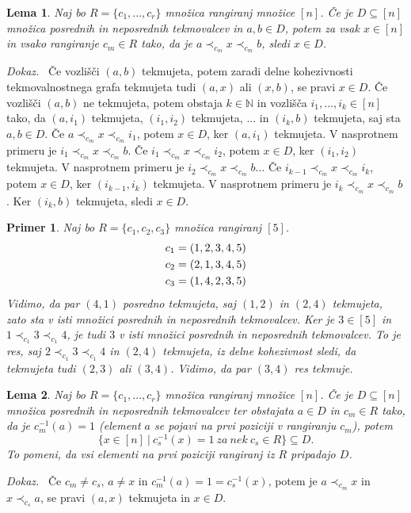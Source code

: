 \documentclass[a4paper, 12pt]{book}
\newtheorem{lema}{Lema}[chapter]
\newtheorem{primer}{Primer}[chapter]
\newenvironment{dokaz}{\emph{Dokaz.}\ }{\hspace{\fill}{$\Box$}}
\begin{document}
\begin{lema}
\label{lema_algoritem_posredni_tekmovalci_1}
    Naj bo $R = \{ c_1, ..., c_r \}$ množica rangiranj množice $[n]$. Če je $D \subseteq [n]$ množica posrednih in neposrednih tekmovalcev in $a, b \in D$, potem za vsak $x \in [n]$ in vsako rangiranje $c_m \in R$ tako, da je $a \prec_{c_m} x \prec_{c_m} b$, sledi $x \in D$.
\end{lema}
\begin{dokaz}
    Če vozlišči $(a, b)$ tekmujeta, potem zaradi delne kohezivnosti tekmovalnostnega grafa tekmujeta tudi $(a, x)$ ali $(x, b)$, se pravi $x \in D$. Če vozlišči $(a, b)$ ne tekmujeta, potem obstaja $k \in \mathbb{N}$ in vozlišča $i_1, ..., i_k \in [n]$ tako, da $(a, i_1)$ tekmujeta, $(i_1, i_2)$ tekmujeta, ... in $(i_k, b)$ tekmujeta, saj sta $a,b \in D$. Če $a \prec_{c_m} x \prec_{c_m} i_1$, potem $x \in D$, ker $(a, i_1)$ tekmujeta. V nasprotnem primeru je $i_1 \prec_{c_m} x \prec_{c_m} b$. Če $i_1 \prec_{c_m} x \prec_{c_m} i_2$, potem $x \in D$, ker $(i_1, i_2)$ tekmujeta. V nasprotnem primeru je $i_2 \prec_{c_m} x \prec_{c_m} b$... Če $i_{k-1} \prec_{c_m} x \prec_{c_m} i_k$, potem $x \in D$, ker $(i_{k-1}, i_k)$ tekmujeta. V nasprotnem primeru je $i_k \prec_{c_m} x \prec_{c_m} b$. Ker $(i_k, b)$ tekmujeta, sledi $x \in D$.
\end{dokaz}

\begin{primer}
    Naj bo $R = \{ c_1, c_2, c_3\}$ množica rangiranj $[5]$.
    \begin{align}
        c_1 &= (1, 2, 3, 4, 5) \notag\\
        c_2 &= (2, 1, 3, 4, 5) \notag\\
        c_3 &= (1, 4, 2, 3, 5) \notag
    \end{align}
    Vidimo, da par $(4, 1)$ posredno tekmujeta, saj $(1, 2)$ in $(2, 4)$ tekmujeta, zato sta v isti množici posrednih in neposrednih tekmovalcev. Ker je $3 \in [5]$ in $1 \prec_{c_1} 3 \prec_{c_1} 4$, je tudi $3$ v isti množici posrednih in neposrednih tekmovalcev. To je res, saj $2 \prec_{c_1} 3 \prec_{c_1} 4$ in $(2, 4)$ tekmujeta, iz delne kohezivnost sledi, da tekmujeta tudi $(2, 3)$ ali $(3, 4)$. Vidimo, da par $(3, 4)$ res tekmuje.
\end{primer}

\begin{lema}
\label{lema_algoritem_posredni_tekmovalci_2}
    Naj bo $R = \{ c_1, ..., c_r \}$ množica rangiranj množice $[n]$. Če je $D \subseteq [n]$ množica posrednih in neposrednih tekmovalcev ter obstajata $a \in D$ in  $c_m \in R$ tako, da je $c_m^{-1}(a) = 1$ (element $a$ se pojavi na prvi poziciji v rangiranju $c_m$), potem 
    \[
        \{ x \in [n] \ | \ c_s^{-1}(x) = 1 \ za \ nek \ c_s \in R \} \subseteq D.    
    \]
    To pomeni, da vsi elementi na prvi poziciji rangiranj iz $R$ pripadajo $D$.
\end{lema}
\begin{dokaz}
    Če $c_m \neq c_s$,  $a \neq x$ in $c_m^{-1}(a) = 1 = c_s^{-1}(x)$, potem je $a \prec_{c_m} x$ in $x \prec_{c_s} a$, se pravi $(a, x)$ tekmujeta in $x \in D$. 
\end{dokaz}
\end{document}
